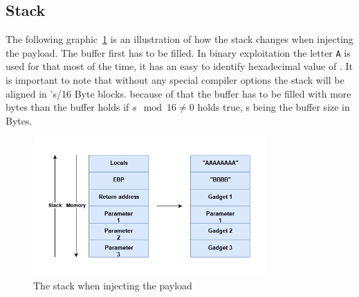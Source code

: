 \documentclass[journal=tosc,submission, notanonymous]{iacrtrans}
\begin{document}
\subsection{Stack}
The following graphic~\cref{fig:stack} is an illustration of how the stack changes when injecting the payload. The buffer first has to be filled. In binary exploitation the letter \Verb+A+ is used for that most of the time, it has an easy to identify hexadecimal value of . It is important to note that without any special compiler options the stack will be aligned in 's/16 Byte blocks. because of that the buffer has to be filled with more bytes than the buffer holds if $s \mod 16 \neq 0$ holds true, s being the buffer size in Bytes.
\newpage
\begin{figure}[h!]
  \centering
  \includegraphics[width=0.79\textwidth]{stackropoffsec.png}
  \caption{The stack when injecting the payload}
  \label{fig:stack}
\end{figure}
\end{document}
